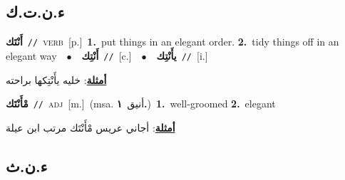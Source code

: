 \documentclass[10pt,a4paper,twoside]{article} %
\begin{document}
\begin{multicols}{2}
\vspace{-3mm}
\subsection*{\color{blue}\foreignlanguage{arabic}{ء.ن.ت.ك}\color{blue}{ (ntws)}} 

{\setlength\topsep{0pt}\textbf{\foreignlanguage{arabic}{أَنْتَك}}\ {\color{gray}\texttt{//}\color{black}}\ \textsc{verb}\ [p.]\ \textbf{1.}~put things in an elegant order.  \textbf{2.}~tidy things off in an elegant way\ \ $\bullet$\ \ \setlength\topsep{0pt}\textbf{\foreignlanguage{arabic}{أَنْتِك}}\ {\color{gray}\texttt{//}\color{black}}\ [c.]\ \ $\bullet$\ \ \setlength\topsep{0pt}\textbf{\foreignlanguage{arabic}{يأَنْتِك}}\ {\color{gray}\texttt{//}\color{black}}\ [i.]\  \begin{flushright}\color{gray}\foreignlanguage{arabic}{\textbf{\underline{\foreignlanguage{arabic}{أمثلة}}}: خليه يأَنْتِكها براحته}\end{flushright}\color{black}} \vspace{2mm}

{\setlength\topsep{0pt}\textbf{\foreignlanguage{arabic}{مْأَنْتَك}}\ {\color{gray}\texttt{//}\color{black}}\ \textsc{adj}\ [m.]\ \color{gray}(msa. \foreignlanguage{arabic}{أنيق}~\foreignlanguage{arabic}{\textbf{١.}})\color{black}\ \textbf{1.}~well-groomed  \textbf{2.}~elegant\  \begin{flushright}\color{gray}\foreignlanguage{arabic}{\textbf{\underline{\foreignlanguage{arabic}{أمثلة}}}: أجاني عريس مْأَنْتَك مرتب ابن عيلة}\end{flushright}\color{black}} \vspace{2mm}

\vspace{-3mm}
\subsection*{\color{blue}\foreignlanguage{arabic}{ء.ن.ث}\color{blue}{}} 


\end{multicols}
\end{document}
